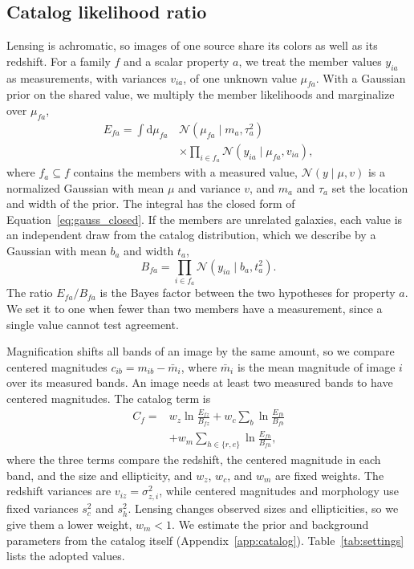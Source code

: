 \documentclass[twocolumn,twocolappendix,linenumbers]{aastex701}
\newcommand{\N}{\mathcal{N}}
\newcommand{\dd}{\mathrm{d}}
\begin{document}
\subsection{Catalog likelihood ratio}
\label{sec:catalog}
Lensing is achromatic, so images of one source share its colors as well as its redshift.
For a family $f$ and a scalar property $a$, we treat the member values $y_{ia}$ as measurements, with variances $v_{ia}$, of one unknown value $\mu_{fa}$.
With a Gaussian prior on the shared value, we multiply the member likelihoods and marginalize over $\mu_{fa}$,
\begin{equation}
\begin{aligned}
E_{fa}=\int\dd\mu_{fa}\,&\N(\mu_{fa}\mid m_a,\tau_a^2)\\
&\times\prod_{i\in f_a}\N(y_{ia}\mid\mu_{fa},v_{ia}),
\end{aligned}
\label{eq:catalog_marginal}
\end{equation}
where $f_a\subseteq f$ contains the members with a measured value, $\N(y\mid\mu,v)$ is a normalized Gaussian with mean $\mu$ and variance $v$, and $m_a$ and $\tau_a$ set the location and width of the prior.
The integral has the closed form of Equation~\ref{eq:gauss_closed}.
If the members are unrelated galaxies, each value is an independent draw from the catalog distribution, which we describe by a Gaussian with mean $b_a$ and width $t_a$,
\begin{equation}
B_{fa}=\prod_{i\in f_a}\N(y_{ia}\mid b_a,t_a^2).
\label{eq:catalog_background}
\end{equation}
The ratio $E_{fa}/B_{fa}$ is the Bayes factor between the two hypotheses for property $a$.
We set it to one when fewer than two members have a measurement, since a single value cannot test agreement.

Magnification shifts all bands of an image by the same amount, so we compare centered magnitudes $c_{ib}=m_{ib}-\bar m_i$, where $\bar m_i$ is the mean magnitude of image $i$ over its measured bands.
An image needs at least two measured bands to have centered magnitudes.
The catalog term is
\begin{equation}
\begin{aligned}
C_f={}&w_z\ln\frac{E_{fz}}{B_{fz}}+w_c\sum_b\ln\frac{E_{fb}}{B_{fb}}\\
&+w_m\sum_{h\in\{r,e\}}\ln\frac{E_{fh}}{B_{fh}},
\end{aligned}
\label{eq:catalog_score}
\end{equation}
where the three terms compare the redshift, the centered magnitude in each band, and the size and ellipticity, and $w_z$, $w_c$, and $w_m$ are fixed weights.
The redshift variances are $v_{iz}=\sigma_{z,i}^2$, while centered magnitudes and morphology use fixed variances $s_c^2$ and $s_h^2$.
Lensing changes observed sizes and ellipticities, so we give them a lower weight, $w_m<1$.
We estimate the prior and background parameters from the catalog itself (Appendix~\ref{app:catalog}).
Table~\ref{tab:settings} lists the adopted values.
\end{document}
